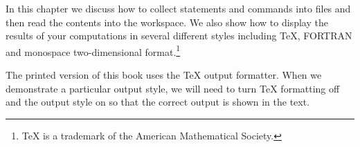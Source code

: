 
%
%
%
%
%


In this chapter we discuss how to collect \Language{} statements
and commands into files and then read the contents into the
workspace.
We also show how to display the results of your computations in
several different styles including \TeX{}, FORTRAN and
monospace two-dimensional format.\footnote{\TeX{} is a
trademark of the American Mathematical Society.}

The printed version of this book uses the \Language{}
\TeX{} output formatter.
When we demonstrate a particular output style, we will need to
turn \TeX{} formatting off and the output style on so
that the correct output is shown in the text.

